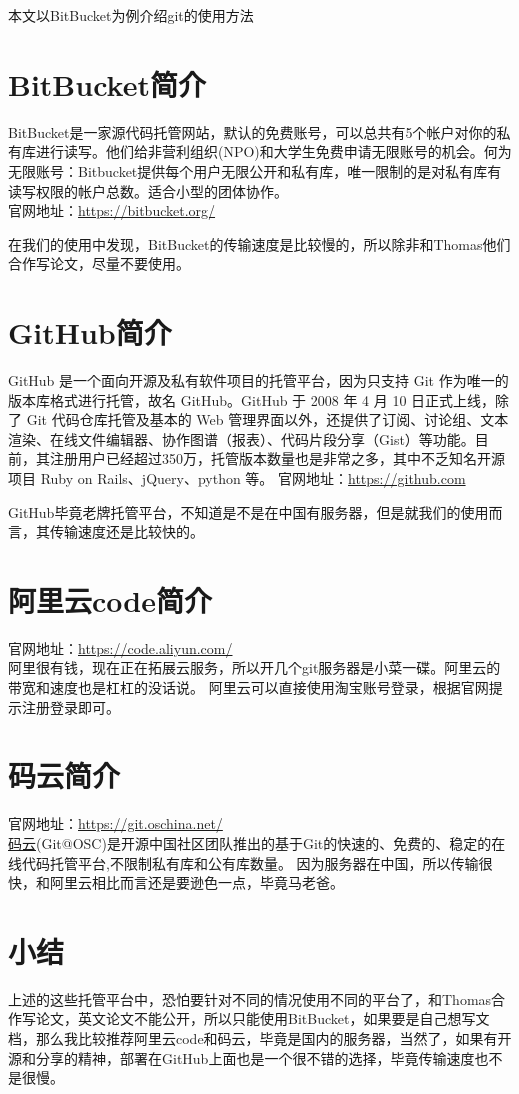 \documentclass[a4paper,12pt]{ctexbook}
\begin{document}
\begin{flushleft}
\textcolor[rgb]{0.00,1.00,0.25}{本文以BitBucket为例介绍git的使用方法}

\section{BitBucket简介}
BitBucket是一家源代码托管网站，默认的免费账号，可以总共有5个帐户对你的私有库进行读写。他们给非营利组织(NPO)和大学生免费申请无限账号的机会。何为无限账号：Bitbucket提供每个用户无限公开和私有库，唯一限制的是对私有库有读写权限的帐户总数。适合小型的团体协作。\\
官网地址：\url{https://bitbucket.org/}

在我们的使用中发现，BitBucket的传输速度是比较慢的，所以除非和Thomas他们合作写论文，尽量不要使用。
\section{GitHub简介}
GitHub 是一个面向开源及私有软件项目的托管平台，因为只支持 Git 作为唯一的版本库格式进行托管，故名 GitHub。GitHub 于 2008 年 4 月 10 日正式上线，除了 Git 代码仓库托管及基本的 Web 管理界面以外，还提供了订阅、讨论组、文本渲染、在线文件编辑器、协作图谱（报表）、代码片段分享（Gist）等功能。目前，其注册用户已经超过350万，托管版本数量也是非常之多，其中不乏知名开源项目 Ruby on Rails、jQuery、python 等。
官网地址：\url{https://github.com}

GitHub毕竟老牌托管平台，不知道是不是在中国有服务器，但是就我们的使用而言，其传输速度还是比较快的。
\section{阿里云code简介}
官网地址：\url{https://code.aliyun.com/}\\
阿里很有钱，现在正在拓展云服务，所以开几个git服务器是小菜一碟。阿里云的带宽和速度也是杠杠的没话说。
阿里云可以直接使用淘宝账号登录，根据官网提示注册登录即可。
\section{码云简介}
官网地址：\url{https://git.oschina.net/}\\
\hyperref{https://git.oschina.net/}{category}{码云}{码云}(Git@OSC)是开源中国社区团队推出的基于Git的快速的、免费的、稳定的在线代码托管平台,不限制私有库和公有库数量。
因为服务器在中国，所以传输很快，和阿里云相比而言还是要逊色一点，毕竟马老爸。
\section{小结}
上述的这些托管平台中，恐怕要针对不同的情况使用不同的平台了，和Thomas合作写论文，英文论文不能公开，所以只能使用BitBucket，如果要是自己想写文档，那么我比较推荐阿里云code和码云，毕竟是国内的服务器，当然了，如果有开源和分享的精神，部署在GitHub上面也是一个很不错的选择，毕竟传输速度也不是很慢。


\end{flushleft}
\end{document}
